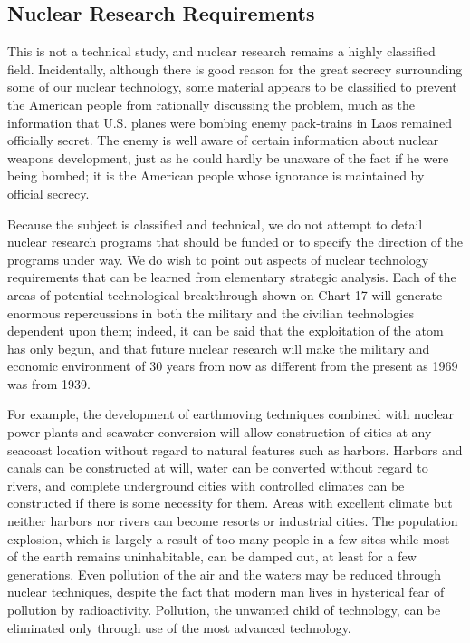 \subsection{Nuclear Research Requirements}
This is not a technical study, and nuclear research remains a highly classified field. Incidentally, although there is good reason for the great secrecy surrounding some of our nuclear technology, some material appears to be classified to prevent the American people from rationally discussing the problem, much as the information that U.S. planes were bombing enemy pack-trains in Laos remained officially secret. The enemy is well aware of certain information about nuclear weapons development, just as he could hardly be unaware of the fact if he were being bombed; it is the American people whose ignorance is maintained by official secrecy.

Because the subject is classified and technical, we do not attempt to detail nuclear research programs that should be funded or to specify the direction of the programs under way. We do wish to point out aspects of nuclear technology requirements that can be learned from elementary strategic analysis. Each of the areas of potential technological breakthrough shown on Chart 17 will generate enormous repercussions in both the military and the civilian technologies dependent upon them; indeed, it can be said that the exploitation of the atom has only begun, and that future nuclear research will make the military and economic environment of 30 years from now as different from the present as 1969 was from 1939.

For example, the development of earthmoving techniques combined with nuclear power plants and seawater conversion will allow construction of cities at any seacoast location without regard to natural features such as harbors. Harbors and canals can be constructed at will, water can be converted without regard to rivers, and complete underground cities with controlled climates can be constructed if there is some necessity for them. Areas with excellent climate but neither harbors nor rivers can become resorts or industrial cities. The population explosion, which is largely a result of too many people in a few sites while most of the earth remains uninhabitable, can be damped out, at least for a few generations. Even pollution of the air and the waters may be reduced through nuclear techniques, despite the fact that modern man lives in hysterical fear of pollution by radioactivity. Pollution, the unwanted child of technology, can be eliminated only through use of the most advanced technology.

